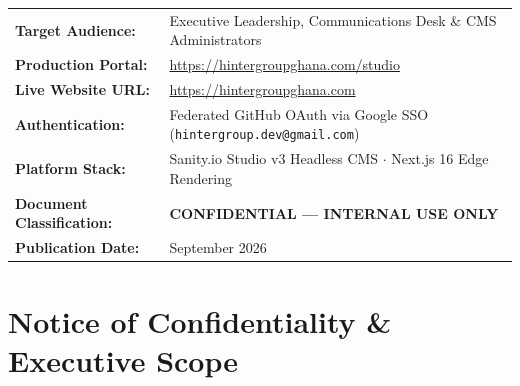 \documentclass[11pt,a4paper,oneside]{book}
\begin{document}
\begin{titlepage}
\begin{center}
    \vfill

    \begin{tcolorbox}[
        colback=white,
        colframe=HGGGoldLight,
        boxrule=1.2pt,
        arc=3mm,
        width=0.96\textwidth,
        left=6mm,right=6mm,top=4mm,bottom=4mm
    ]
    \small\color{HGGDarkText}
    \begin{tabularx}{\textwidth}{@{}lX@{}}
        \textbf{\color{HGGNavy}Target Audience:} & Executive Leadership, Communications Desk \& CMS Administrators \\
        \addlinespace[2pt]
        \textbf{\color{HGGNavy}Production Portal:} & \url{https://hintergroupghana.com/studio} \\
        \addlinespace[2pt]
        \textbf{\color{HGGNavy}Live Website URL:} & \url{https://hintergroupghana.com} \\
        \addlinespace[2pt]
        \textbf{\color{HGGNavy}Authentication:} & Federated GitHub OAuth via Google SSO (\texttt{hintergroup.dev@gmail.com}) \\
        \addlinespace[2pt]
        \textbf{\color{HGGNavy}Platform Stack:} & Sanity.io Studio v3 Headless CMS $\cdot$ Next.js 16 Edge Rendering \\
        \addlinespace[2pt]
        \textbf{\color{HGGNavy}Document Classification:} & \textbf{\color{HGGRed}CONFIDENTIAL — INTERNAL USE ONLY} \\
        \addlinespace[2pt]
        \textbf{\color{HGGNavy}Publication Date:} & September 2026 \\
    \end{tabularx}
    \end{tcolorbox}

    \vspace{0.4cm}
\end{center}
\end{titlepage}

\nopagecolor
\color{HGGDarkText}
\frontmatter

\chapter*{Notice of Confidentiality \& Executive Scope}
\end{document}
